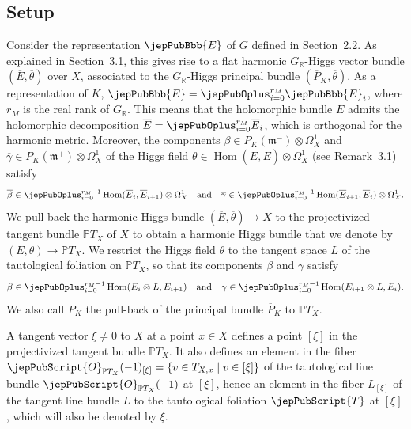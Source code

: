 \subsection{Setup}
Consider the representation $\jepPubBbb{E}$ of $G$ defined in Section~2.2. As explained in Section~3.1, this gives rise to a flat harmonic $G_{\mathbb R}$-Higgs vector bundle $(\overline E,\overline\theta)$ over $X$, associated to the $G_{\mathbb R}$-Higgs principal bundle $(\overline P_K,\overline\theta)$. As a representation of $K$, $\jepPubBbb{E}=\jepPubOplus_{i=0}^{r_M}\jepPubBbb{E}_i$, where $r_M$ is the real rank of $G_{\mathbb R}$. This means that the holomorphic bundle $\overline E$ admits the holomorphic decomposition $\overline E=\jepPubOplus_{i=0}^{r_M}\overline E_i$, which is orthogonal for the harmonic metric. Moreover, the components $\overline\beta\in\overline P_K(\mathfrak m^-)\otimes\Omega_X^1$ and $\overline\gamma\in\overline P_K(\mathfrak m^+)\otimes\Omega_X^1$ of the Higgs field $\overline\theta\in\operatorname{Hom}(\overline E,\overline E)\otimes\Omega_X^1$ (see Remark~3.1) satisfy
\[
\overline\beta\in\jepPubOplus_{i=0}^{r_M-1}\operatorname{Hom}(\overline E_i,\overline E_{i+1})\otimes\Omega_X^1\quad\text{and}\quad\overline\gamma\in\jepPubOplus_{i=0}^{r_M-1}\operatorname{Hom}(\overline E_{i+1},\overline E_i)\otimes\Omega_X^1.
\]
We pull-back the harmonic Higgs bundle $(\overline E,\overline\theta)\to X$ to the projectivized tangent bundle $\mathbb PT_X$ of $X$ to obtain a harmonic Higgs bundle that we denote by $(E,\theta)\to\mathbb PT_X$. We restrict the Higgs field $\theta$ to the tangent space $L$ of the tautological foliation on $\mathbb PT_X$, so that its components $\beta$ and $\gamma$ satisfy
\[
\beta\in\jepPubOplus_{i=0}^{r_M-1}\operatorname{Hom}(E_i\otimes L,E_{i+1})\quad\text{and}\quad\gamma\in\jepPubOplus_{i=0}^{r_M-1}\operatorname{Hom}(E_{i+1}\otimes L,E_i).
\]
We also call $P_K$ the pull-back of the principal bundle $\overline P_K$ to $\mathbb PT_X$.
\begin{notation}
A tangent vector $\xi\neq0$ to $X$ at a point $x\in X$ defines a point $[\xi]$ in the projectivized tangent bundle $\mathbb PT_X$. It also defines an element in the fiber $\jepPubScript{O}_{\mathbb PT_X}(-1)_{[\xi]}=\{v\in T_{X,x}\mid v\in[\xi]\}$ of the tautological line bundle $\jepPubScript{O}_{\mathbb PT_X}(-1)$ at $[\xi]$, hence an element in the fiber $L_{[\xi]}$ of the tangent line bundle $L$ to the tautological foliation $\jepPubScript{T}$ at $[\xi]$, which will also be denoted by $\xi$.
\end{notation}
